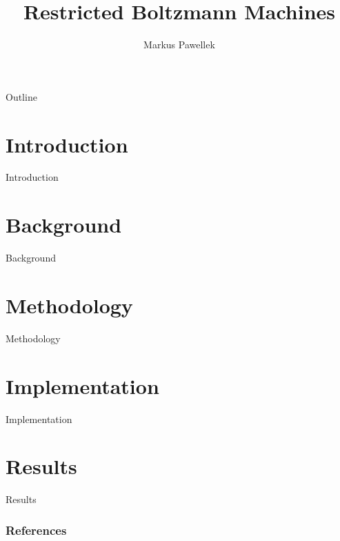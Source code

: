 \documentclass[aspectratio=169]{beamer}
\title{Restricted Boltzmann Machines}
\author{Markus Pawellek}
\begin{document}

  \frame{\titlepage}
  \begin{frame}{Outline}
    \footnotesize
    \hfill\parbox[t][7cm][l]{0.9\textwidth}{\tableofcontents}
  \end{frame}

  \section{Introduction} %
  \label{sec:introduction}
    \begin{frame}{Introduction}

    \end{frame}

  \section{Background} %
  \label{sec:background}
    \begin{frame}{Background}

    \end{frame}

  \section{Methodology} %
  \label{sec:methodology}
    \begin{frame}{Methodology}

    \end{frame}

  \section{Implementation} %
  \label{sec:implementation}
    \begin{frame}{Implementation}

    \end{frame}

  \section{Results} %
  \label{sec:results}
    \begin{frame}{Results}

    \end{frame}

  \begin{frame}
    \frametitle{References}
    \scriptsize
    \begin{multicols}{2}
      \nocite{*}
      
    \end{multicols}
  \end{frame}
\end{document}
